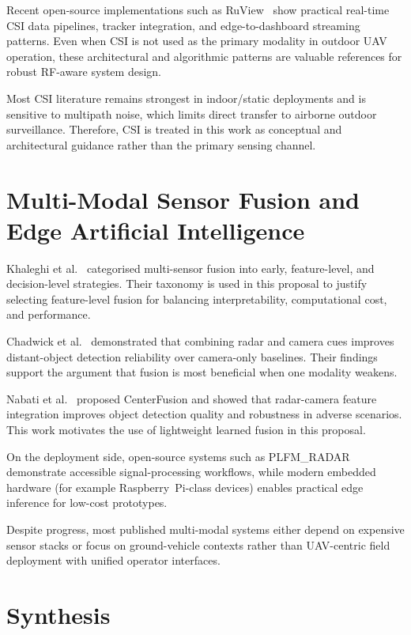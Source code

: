 Recent open-source implementations such as RuView~\cite{ruview} show practical real-time CSI data pipelines, tracker integration, and edge-to-dashboard streaming patterns. Even when CSI is not used as the primary modality in outdoor UAV operation, these architectural and algorithmic patterns are valuable references for robust RF-aware system design.

Most CSI literature remains strongest in indoor/static deployments and is sensitive to multipath noise, which limits direct transfer to airborne outdoor surveillance. Therefore, CSI is treated in this work as conceptual and architectural guidance rather than the primary sensing channel.

\section{Multi-Modal Sensor Fusion and Edge Artificial Intelligence}

Khaleghi et al.~\cite{khaleghi2013multisensor} categorised multi-sensor fusion into early, feature-level, and decision-level strategies. Their taxonomy is used in this proposal to justify selecting feature-level fusion for balancing interpretability, computational cost, and performance.

Chadwick et al.~\cite{chadwick2019distantvehicle} demonstrated that combining radar and camera cues improves distant-object detection reliability over camera-only baselines. Their findings support the argument that fusion is most beneficial when one modality weakens.

Nabati et al.~\cite{nabati2021centerfusion} proposed CenterFusion and showed that radar-camera feature integration improves object detection quality and robustness in adverse scenarios. This work motivates the use of lightweight learned fusion in this proposal.

On the deployment side, open-source systems such as PLFM\_RADAR~\cite{plfm_radar} demonstrate accessible signal-processing workflows, while modern embedded hardware (for example Raspberry~Pi-class devices) enables practical edge inference for low-cost prototypes.

Despite progress, most published multi-modal systems either depend on expensive sensor stacks or focus on ground-vehicle contexts rather than UAV-centric field deployment with unified operator interfaces.

\section{Synthesis}

